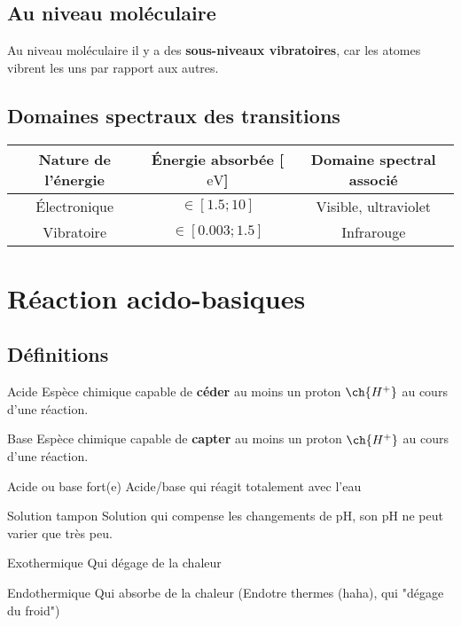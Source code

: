 \documentclass{article}
\let\ce\ch
\newenvironment{definitions}{\begin{description}[leftmargin=!,labelwidth=\widthof{\bfseries Lorem ipsum dolor}]}{\end{description}}
\begin{document}
\subsection{Au niveau moléculaire}

Au niveau moléculaire il y a des \textbf{sous-niveaux vibratoires}, car les atomes vibrent les uns par rapport aux autres.

\subsection{Domaines spectraux des transitions}
\begin{table}[h]
    \centering
    \begin{tabular}{c|c|c}
         Nature de l'énergie & Énergie absorbée [$\si{\eV}$] & Domaine spectral associé \\
         \hline
         Électronique & $\in [1.5 ; 10]$ & Visible, ultraviolet \\
         Vibratoire & $\in [0.003  ; 1.5]$ & Infrarouge
    \end{tabular}
    \label{tab:spectral_domains}
\end{table}

\newpage

\section{Réaction acido-basiques}

\subsection{Définitions}

\begin{definitions}

\item[Acide]
Espèce chimique capable de \textbf{céder} au moins un proton $\ce{H^+}$ au cours d’une réaction.

\item[Base]
Espèce chimique capable de \textbf{capter} au moins un proton $\ce{H^+}$ au cours d’une réaction.

\item[Acide ou base fort(e)]
Acide/base qui réagit totalement avec l'eau

\item[Solution tampon]
Solution qui compense les changements de pH, son pH ne peut varier que très peu.

\item[Exothermique]
Qui dégage de la chaleur

\item[Endothermique]
Qui absorbe de la chaleur (Endotre thermes (haha), qui "dégage du froid")

\end{definitions}
\end{document}
